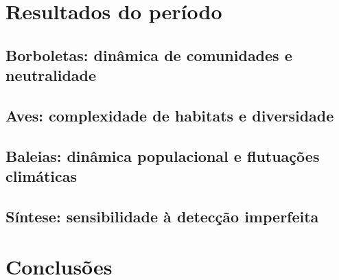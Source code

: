 \documentclass[12pt, A4]{article}
\begin{document}
\section{Resultados do período}

\subsection{Borboletas: dinâmica de comunidades e neutralidade} %
\label{sec:dinamica-temporal-borb}

\subsection{Aves: complexidade de habitats e diversidade} %
\label{sec:compl-de-habit}

\subsection{Baleias: dinâmica populacional e flutuações climáticas} %
\label{sec:dinam-popul-de}

\subsection{Síntese: sensibilidade à detecção imperfeita} %

\section{Conclusões} %
\end{document}
